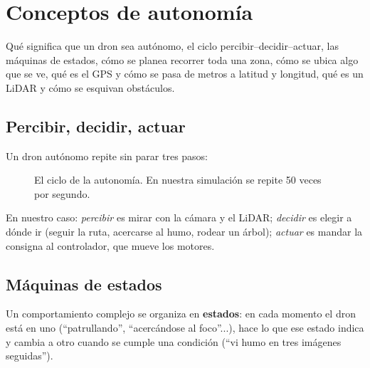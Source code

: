 \chapter{Conceptos de autonomía}
\label{cap:conceptos-autonomia}

\begin{enpocas}
Qué significa que un dron sea autónomo, el ciclo percibir--decidir--actuar, las máquinas de estados,
cómo se planea recorrer toda una zona, cómo se ubica algo que se ve, qué es el GPS y cómo se pasa de
metros a latitud y longitud, qué es un LiDAR y cómo se esquivan obstáculos.
\end{enpocas}

\section{Percibir, decidir, actuar}

Un dron autónomo repite sin parar tres pasos:
\begin{figure}[H]
\centering
{}
\caption{El ciclo de la autonomía. En nuestra simulación se repite 50 veces por segundo.}
\end{figure}
En nuestro caso: \emph{percibir} es mirar con la cámara y el LiDAR; \emph{decidir} es elegir a dónde
ir (seguir la ruta, acercarse al humo, rodear un árbol); \emph{actuar} es mandar la consigna al
controlador, que mueve los motores.

\section{Máquinas de estados}

Un comportamiento complejo se organiza en \textbf{estados}: en cada momento el dron está en uno
(``patrullando'', ``acercándose al foco''...), hace lo que ese estado indica y cambia a otro cuando se
cumple una condición (``vi humo en tres imágenes seguidas'').

